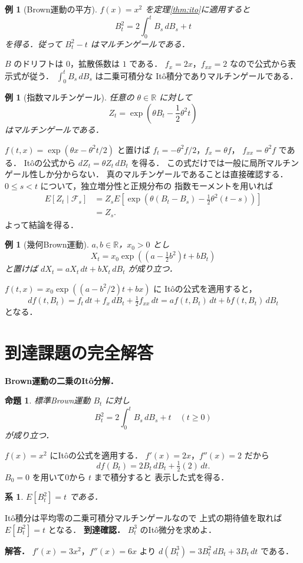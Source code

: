 \documentclass[a5paper,10pt,onecolumn]{jsarticle}
\makeatletter
\theoremstyle{mathnotetheorem}
\newtheorem{proposition}[theorem]{命題}
\newtheorem{corollary}[theorem]{系}
\newtheorem{example}[theorem]{例}
\renewcommand{\proofname}{証明}
\renewenvironment{proof}[1][\proofname]{%
  \par\pushQED{\qed}\normalfont\topsep4\p@\@plus2\p@\relax
  \trivlist\item[\hskip\labelsep\bfseries #1]\ignorespaces
}{\popQED\endtrivlist\@endpefalse}
\makeatother
\begin{document}
\begin{example}[Brown運動の平方]
$f(x)=x^2$ を定理\ref{thm:ito}に適用すると
\[
 B_t^2=2\int_0^tB_s\,dB_s+t
\]
を得る．従って $B_t^2-t$ はマルチンゲールである．
\end{example}
\begin{proof}
$B$ のドリフトは $0$，拡散係数は $1$ である．
$f_x=2x$，$f_{xx}=2$ なので公式から表示式が従う．
$\int_0^tB_s\,dB_s$ は二乗可積分な
It\^o積分でありマルチンゲールである．
\end{proof}

\begin{example}[指数マルチンゲール]
任意の $\theta\in\mathbb R$ に対して
\[
 Z_t=\exp\!\left(\theta B_t-\frac12\theta^2t\right)
\]
はマルチンゲールである．
\end{example}
\begin{proof}
$f(t,x)=\exp(\theta x-\theta^2t/2)$ と置けば
$f_t=-\theta^2f/2$，$f_x=\theta f$，
$f_{xx}=\theta^2f$ である．
It\^oの公式から
$dZ_t=\theta Z_t\,dB_t$ を得る．
この式だけでは一般に局所マルチンゲール性しか分からない．
真のマルチンゲールであることは直接確認する．
$0\le s<t$ について，独立増分性と正規分布の
指数モーメントを用いれば
\begin{align*}
 E[Z_t\mid\mathcal F_s]
 &=Z_sE\left[
 \exp\!\left(\theta(B_t-B_s)
  -\tfrac12\theta^2(t-s)\right)\right]\\
 &=Z_s.
\end{align*}
よって結論を得る．
\end{proof}

\begin{example}[幾何Brown運動]
$a,b\in\mathbb R$，$x_0>0$ とし
\[
 X_t=x_0\exp\!\left((a-\tfrac12b^2)t+bB_t\right)
\]
と置けば
$dX_t=aX_t\,dt+bX_t\,dB_t$ が成り立つ．
\end{example}
\begin{proof}
$f(t,x)=x_0\exp((a-b^2/2)t+bx)$ に
It\^oの公式を適用すると，
\[
 df(t,B_t)=f_t\,dt+f_x\,dB_t
    +\tfrac12f_{xx}\,dt
 =af(t,B_t)\,dt+bf(t,B_t)\,dB_t
\]
となる．
\end{proof}


\section{到達課題の完全解答}
\noindent\textbf{Brown運動の二乗のItô分解．}
\begin{proposition}
標準Brown運動 $B_t$ に対し
\[
B_t^2=2\int_0^tB_s\,dB_s+t
\quad(t\ge0)
\]
が成り立つ．
\end{proposition}
\begin{proof}
$f(x)=x^2$ にItôの公式を適用する．
$f'(x)=2x$，$f''(x)=2$ だから
\[
df(B_t)=2B_t\,dB_t+\tfrac12(2)\,dt.
\]
$B_0=0$ を用いて0から $t$ まで積分すると
表示した式を得る．
\end{proof}
\begin{corollary}
$E[B_t^2]=t$ である．
\end{corollary}
\begin{proof}
Itô積分は平均零の二乗可積分マルチンゲールなので
上式の期待値を取れば $E[B_t^2]=t$ となる．
\end{proof}
\noindent\textbf{到達確認．}
$B_t^3$ のItô微分を求めよ．
\par\noindent\textbf{解答．}
$f'(x)=3x^2$，$f''(x)=6x$ より
$d(B_t^3)=3B_t^2\,dB_t+3B_t\,dt$ である．
\end{document}
